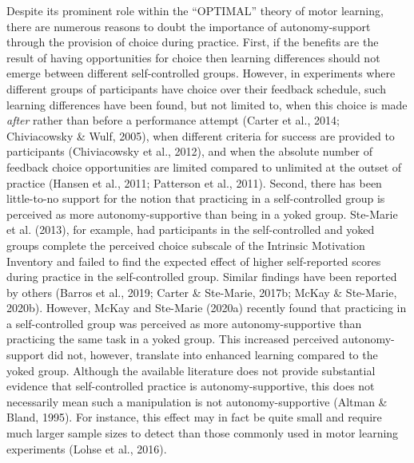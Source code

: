 \documentclass[
  english,
  man,floatsintext]{apa7}
\begin{document}
Despite its prominent role within the ``OPTIMAL'' theory of motor learning, there are numerous reasons to doubt the importance of autonomy-support through the provision of choice during practice. First, if the benefits are the result of having opportunities for choice then learning differences should not emerge between different self-controlled groups. However, in experiments where different groups of participants have choice over their feedback schedule, such learning differences have been found, but not limited to, when this choice is made \emph{after} rather than before a performance attempt (Carter et al., 2014; Chiviacowsky \& Wulf, 2005), when different criteria for success are provided to participants (Chiviacowsky et al., 2012), and when the absolute number of feedback choice opportunities are limited compared to unlimited at the outset of practice (Hansen et al., 2011; Patterson et al., 2011). Second, there has been little-to-no support for the notion that practicing in a self-controlled group is perceived as more autonomy-supportive than being in a yoked group. Ste-Marie et al. (2013), for example, had participants in the self-controlled and yoked groups complete the perceived choice subscale of the Intrinsic Motivation Inventory and failed to find the expected effect of higher self-reported scores during practice in the self-controlled group. Similar findings have been reported by others (Barros et al., 2019; Carter \& Ste-Marie, 2017b; McKay \& Ste-Marie, 2020b). However, McKay and Ste-Marie (2020a) recently found that practicing in a self-controlled group was perceived as more autonomy-supportive than practicing the same task in a yoked group. This increased perceived autonomy-support did not, however, translate into enhanced learning compared to the yoked group. Although the available literature does not provide substantial evidence that self-controlled practice is autonomy-supportive, this does not necessarily mean such a manipulation is not autonomy-supportive (Altman \& Bland, 1995). For instance, this effect may in fact be quite small and require much larger sample sizes to detect than those commonly used in motor learning experiments (Lohse et al., 2016).
\end{document}
